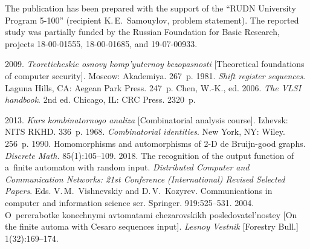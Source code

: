 


\vspace*{-20pt}

\Ack
\noindent
 The publication has been prepared with the support of the ``RUDN University 
Program 5-100'' (recipient K.\,E.~Samouylov, problem statement). The reported 
study was partially funded by the Russian Foundation for Basic Research, projects  
18-00-01555, 18-00-01685, and 19-07-00933.


\vspace*{5pt}

 \begin{multicols}{2}

\renewcommand{\bibname}{\protect\rmfamily References}

{\small\frenchspacing
 {%
 \begin{thebibliography}{9}
 
\vspace*{-8pt}

 2009. 
\textit{Teoreticheskie osnovy komp'yuternoy bezopasnosti} 
[Theoretical foundations of computer 
security]. Moscow: Akademiya. 267~p.
 1981. \textit{Shift register sequences}. Laguna Hills, CA: 
Aegean Park Press. 247~p.
Chen, W.-K., ed. 2006. \textit{The VLSI handbook}. 2nd ed. Chicago, IL: CRC Press. 
2320~p.

\pagebreak 
 
 2013. \textit{Kurs kombinatornogo analiza} [Combinatorial 
analysis course]. Izhevsk: NITS RKHD. 336~p.
 1968. \textit{Combinatorial identities}. New York, NY: Wiley. 
256~p.
 1990. Homomorphisms and automorphisms of \mbox{2-D} de Bruijn-good 
graphs. \textit{Discrete Math.} 85(1):105--109.
 2018. The recognition of the output 
function of a~finite automaton with random input. \textit{Distributed Computer and 
Communication Networks: 21st Conference (International) Revised Selected 
Papers}. Eds. V.\,M.~Vishnevskiy and D.\,V.~Kozyrev. Communications in 
computer and information science ser. Springer. 919:525--531.
 2004. O~pererabotke konechnymi avtomatami 
chezarovskikh posledovatel'nostey [On the
 finite automa with Cesaro sequences input]. 
\textit{Lesnoy Vestnik} [Forestry Bull.] 1(32):169--174.

\end{thebibliography}

 }
 }

\end{multicols}


